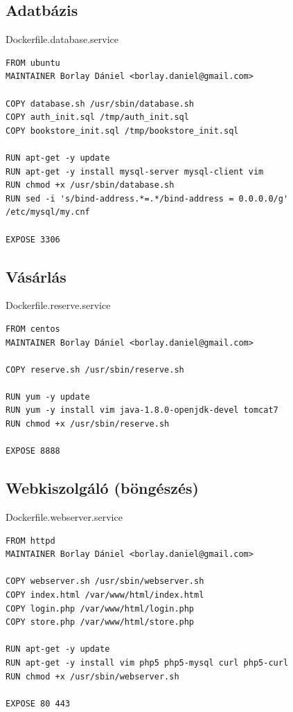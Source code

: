 \documentclass[11pt,magyar,a4paper,oneside,]{report}
\begin{document}
\subsection{Adatbázis}\label{adatbuxe1zis}

Dockerfile.database.service

\begin{verbatim}
FROM ubuntu
MAINTAINER Borlay Dániel <borlay.daniel@gmail.com>

COPY database.sh /usr/sbin/database.sh
COPY auth_init.sql /tmp/auth_init.sql
COPY bookstore_init.sql /tmp/bookstore_init.sql

RUN apt-get -y update
RUN apt-get -y install mysql-server mysql-client vim
RUN chmod +x /usr/sbin/database.sh
RUN sed -i 's/bind-address.*=.*/bind-address = 0.0.0.0/g' /etc/mysql/my.cnf

EXPOSE 3306
\end{verbatim}

\subsection{Vásárlás}\label{vuxe1suxe1rluxe1s}

Dockerfile.reserve.service

\begin{verbatim}
FROM centos
MAINTAINER Borlay Dániel <borlay.daniel@gmail.com>

COPY reserve.sh /usr/sbin/reserve.sh

RUN yum -y update
RUN yum -y install vim java-1.8.0-openjdk-devel tomcat7
RUN chmod +x /usr/sbin/reserve.sh

EXPOSE 8888
\end{verbatim}

\subsection{Webkiszolgáló
(böngészés)}\label{webkiszolguxe1luxf3-buxf6nguxe9szuxe9s}

Dockerfile.webserver.service

\begin{verbatim}
FROM httpd
MAINTAINER Borlay Dániel <borlay.daniel@gmail.com>

COPY webserver.sh /usr/sbin/webserver.sh
COPY index.html /var/www/html/index.html
COPY login.php /var/www/html/login.php
COPY store.php /var/www/html/store.php

RUN apt-get -y update
RUN apt-get -y install vim php5 php5-mysql curl php5-curl
RUN chmod +x /usr/sbin/webserver.sh

EXPOSE 80 443
\end{verbatim}
\end{document}
